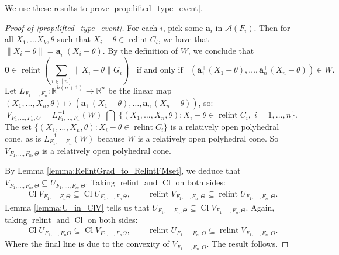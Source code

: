 \documentclass[10pt]{article}
\theoremstyle{definition}
\theoremstyle{remark}
\newcommand{\R}{\mathbb{R}}
\newcommand{\T}{\intercal}
\newcommand{\CType}{F_1,\dots,F_n}
\newcommand{\sample}{ X_1,\dots, X_n}
\DeclareMathOperator{\relint}{relint}
\DeclareMathOperator{\closure}{Cl}
\renewcommand{\vec}[1]{\mathbf{#1}}
\newcommand{\A}{\mathcal{A}}
\begin{document}
	We use these results to prove \cref{prop:lifted_type_event}.
	
	\begin{proof}[Proof of \cref{prop:lifted_type_event}]
		For each $i$, pick some $\vec a_i$ in $\A(F_i)$. Then for all $X_1,\dots X_k, \theta$ such that $X_i - \theta \in \relint C_i$, we have that $\| X_i -\theta \| = \vec a_i^{\T}(X_i - \theta)$. By the definition of $W$, we conclude that
		\[
		\vec 0 \in \relint \left( \textstyle \sum_{i \in [n]} \|X_i- \theta\|G_i \right) \;\;\text{ if and only if }\;\; \left(\vec a_1^{\T} (X_1-\theta), \dots, \vec a_n^{\T} (X_n-\theta)\right) \in W.
		\]
		Let $L_{\CType}:\R^{k(n+1)}\rightarrow \R^n$ be the linear map $(\sample,\theta) \mapsto \left(\vec a_1^{\T} (X_1-\theta), \dots, \vec a_n^{\T} (X_n-\theta)\right)$, so:
		\[
		V_{\CType, \Theta} =   L_{\CType}^{-1}(W) \; \textstyle\bigcap \; \{ (\sample, \theta) : X_i - \theta \in \relint C_i, \; i = 1,\ldots,n \}.
		\]
		The set $\{(X_1,\ldots,X_n,\theta): X_i - \theta \in \relint C_i \}$ is a relatively open polyhedral cone, as is $L_{\CType}^{-1}(W)$ because $W$ is a relatively open polyhedral cone. So $V_{\CType, \Theta}$ is a relatively open polyhedral cone. 
		
		By Lemma \ref{lemma:RelintGrad_to_RelintFMset}, we deduce that $V_{\CType,\Theta} \subseteq U_{\CType,\Theta}$. Taking $\relint$ and $\closure$ on both sides:
		\begin{align*}
			\closure V_{\CType\Theta} \subseteq \closure U_{\CType\Theta}, \qquad 
			\relint V_{\CType,\Theta} \subseteq \relint U_{\CType,\Theta}.
		\end{align*}
		Lemma \ref{lemma:U_in_ClV} tells us that $U_{\CType,\Theta} \subseteq \closure V_{\CType,\Theta}$. Again, taking $\relint$ and $\closure$ on both sides:
		\begin{align*}
			\closure U_{\CType\Theta} \subseteq \closure V_{\CType\Theta}, \qquad
			\relint U_{\CType,\Theta} \subseteq \relint V_{\CType,\Theta}.
		\end{align*}
		Where the final line is due to the convexity of $V_{\CType,\Theta}$. The result follows.
	\end{proof}
	
\end{document}
